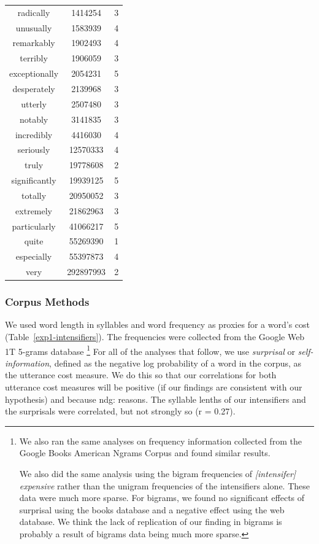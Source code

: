 \documentclass[10pt,letterpaper]{article}
\newcommand{\w}[1]{\emph{#1}}
\newcommand{\todo}[1]{{\color{red}#1}}
\begin{document}
\begin{table}[ht]
\begin{center}
\begin{tabular}{ccc}
    radically & 1414254 & 3 \\
    unusually & 1583939 & 4 \\
    remarkably & 1902493 & 4 \\
    terribly & 1906059 & 3 \\
    exceptionally & 2054231 & 5 \\
    desperately & 2139968 & 3 \\
    utterly & 2507480 & 3 \\
    notably & 3141835 & 3 \\
    incredibly & 4416030 & 4 \\
    seriously & 12570333 & 4 \\
    truly & 19778608 & 2 \\
    significantly & 19939125 & 5 \\
    totally & 20950052 & 3 \\
    extremely & 21862963 & 3 \\
    particularly & 41066217 & 5 \\
    quite & 55269390 & 1 \\
    especially & 55397873 & 4 \\
    very & 292897993 & 2
  \end{tabular}
 \end{center}
\end{table}

\subsubsection{Corpus Methods}

We used word length in syllables and word frequency as proxies for a word's cost (Table~\ref{exp1-intensifiers}).
The frequencies were collected from the Google Web 1T 5-grams database \cite{web1t5gram}\footnote{
We also ran the same analyses on frequency information collected from the Google Books American Ngrams Corpus \cite{books2011} and found similar results.

We also did the same analysis using the bigram frequencies of \w{[intensifer] expensive} rather than the unigram frequencies of the intensifiers alone. These data were much more sparse. For bigrams, we found no significant effects of surprisal using the books database and a negative effect using the web database. We think the lack of replication of our finding in bigrams is probably a result of bigrams data being much more sparse.
}
For all of the analyses that follow, we use \w{surprisal} or \w{self-information}, defined as the negative log probability of a word in the corpus, as the utterance cost measure. We do this so that our correlations for both utterance cost measures will be positive (if our findings are consistent with our hypothesis) and because \todo{ndg: reasons}. The syllable lenths of our intensifiers and the surprisals %
were correlated, but not strongly so (r = 0.27).
\end{document}
